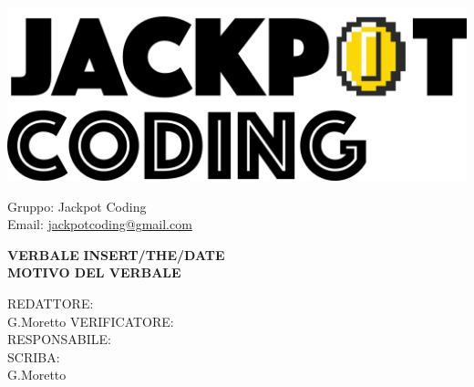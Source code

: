 \documentclass[5pt]{article}
\begin{document}
\begin{minipage}[t]{0.50\textwidth}
    \begin{flushleft}
        \hspace{10pt}
        \includegraphics[scale=0.65]{../../assets/jackpot-logo.png} 
    \end{flushleft}
\end{minipage}
\hspace{-60pt} %
\begin{flushright}
    \begin{minipage}[t]{0.50\textwidth}
        \begin{flushright}
            Gruppo: {\Large Jackpot Coding}\\
            Email: \href{mailto:jackpotcoding@gmail.com}{jackpotcoding@gmail.com}
        \end{flushright}
    \end{minipage}
\end{flushright}

\vspace{24pt}

\begin{center}
    \textbf{\large VERBALE }
    \textbf{\large INSERT/THE/DATE} \\
    \textbf{\LARGE MOTIVO DEL VERBALE}
\end{center}

\vspace{13pt}

\begin{flushleft}
    \begin{spacing}{1.5}
        REDATTORE:  \\G.Moretto%
        VERIFICATORE:   \\%
        RESPONSABILE:   \\%
        \vspace{7pt}
        SCRIBA: \\G.Moretto%
    \end{spacing}
\end{flushleft}
\end{document}
